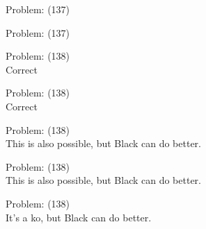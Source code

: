\documentclass[11pt]{article}
\begin{document}
\begin{minipage}[t]{0.5\textwidth}
  {\centering
  
  Problem: (137)\\
  
  }
\end{minipage}
\begin{minipage}[t]{0.5\textwidth}
  {\centering
  
  Problem: (137)\\
  
  }
\end{minipage}
\begin{minipage}[t]{0.5\textwidth}
  {\centering
  
  Problem: (138)\\
  Correct\\
  }
\end{minipage}
\begin{minipage}[t]{0.5\textwidth}
  {\centering
  
  Problem: (138)\\
  Correct\\
  }
\end{minipage}
\begin{minipage}[t]{0.5\textwidth}
  {\centering
  
  Problem: (138)\\
  This is also possible, but Black can do better.\\
  }
\end{minipage}
\begin{minipage}[t]{0.5\textwidth}
  {\centering
  
  Problem: (138)\\
  This is also possible, but Black can do better.\\
  }
\end{minipage}
\begin{minipage}[t]{0.5\textwidth}
  {\centering
  
  Problem: (138)\\
  It's a ko, but Black can do better.\\
  }
\end{minipage}
\end{document}
